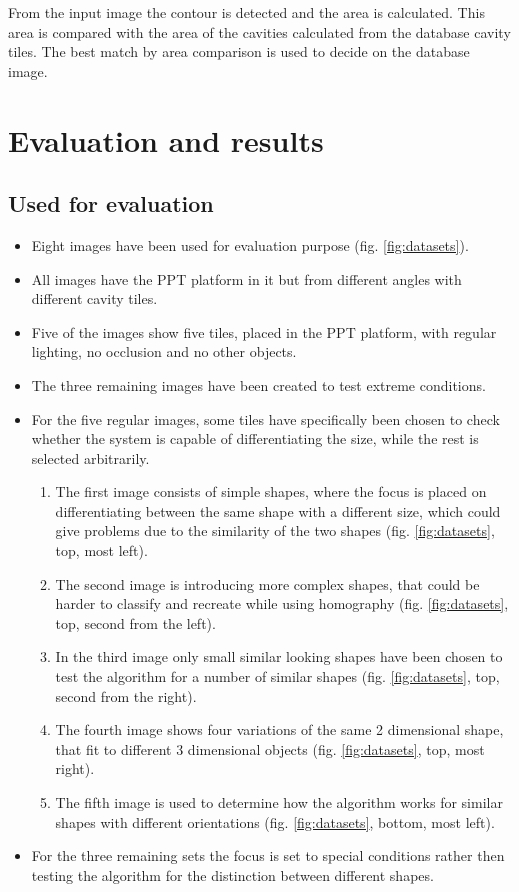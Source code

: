 \documentclass{article}
\begin{document}
From the input image the contour is detected and the area is calculated. This area is compared with the area of the cavities calculated from the database cavity tiles. The best match by area comparison is used to decide on the database image.

\section{Evaluation and results}

\subsection{Used for evaluation}

\begin{itemize}
\item Eight images have been used for evaluation purpose (fig. \ref{fig:datasets}).
\item All images have the PPT platform in it but from different angles with different cavity tiles.
\item Five of the images show five tiles, placed in the PPT platform, with regular lighting, no occlusion and no other objects.
 \item The three remaining images have been created to test extreme conditions.
\item For the five regular images, some tiles have specifically been chosen to check whether the system is capable of differentiating the size, while the rest is selected arbitrarily.
\begin{enumerate}
\item The first image consists of simple shapes, where the focus is placed on differentiating between the same shape with a different size, which could give problems due to the similarity of the two shapes (fig. \ref{fig:datasets}, top, most left).
\item The second image is introducing more complex shapes, that could be harder to classify and recreate while using homography (fig. \ref{fig:datasets}, top, second from the left).
\item In the third image only small similar looking shapes have been chosen to test the algorithm for a number of similar shapes (fig. \ref{fig:datasets}, top, second from the right).
\item The fourth image shows four variations of the same 2 dimensional shape, that fit to different 3 dimensional objects (fig. \ref{fig:datasets}, top, most right).
\item The fifth image is used to determine how the algorithm works for similar shapes with different orientations (fig. \ref{fig:datasets}, bottom, most left).
\end{enumerate}
\item For the three remaining sets the focus is set to special conditions rather then testing the algorithm for the distinction between different shapes.
\begin{enumerate}


\end{enumerate}
\end{itemize}
\end{document}
